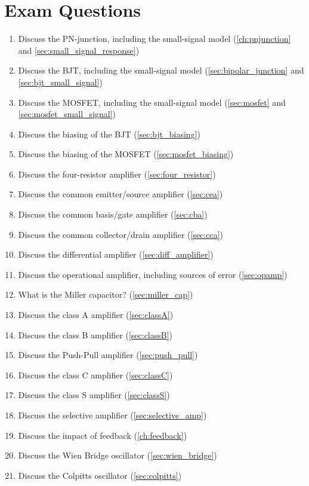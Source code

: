 \chapter{Exam Questions}
\label{app:exam_questions}
	\begin{enumerate}
	\item Discuss the PN-junction, including the small-signal model (\ref{ch:pnjunction} and \ref{sec:small_signal_response})
	\item Discuss the BJT, including the small-signal model (\ref{sec:bipolar_junction} and \ref{sec:bjt_small_signal})
	\item Discuss the MOSFET,  including the small-signal model (\ref{sec:mosfet} and \ref{sec:mosfet_small_signal})
	\item Discuss the biasing of the BJT (\ref{sec:bjt_biasing})
	\item Discuss the biasing of the MOSFET (\ref{sec:mosfet_biasing})
	\item Discuss the four-resistor amplifier (\ref{sec:four_resistor})
	\item Discuss the common emitter/source amplifier (\ref{sec:cea})
	\item Discuss the common basis/gate amplifier (\ref{sec:cba})
	\item Discuss the common collector/drain amplifier (\ref{sec:cca})
	\item Discuss the differential amplifier (\ref{sec:diff_amplifier})
	\item Discuss the operational amplifier, including sources of error (\ref{sec:opamp})
	\item What is the Miller capacitor? (\ref{sec:miller_cap})
	\item Discuss the class A amplifier (\ref{sec:classA})
	\item Discuss the class B amplifier (\ref{sec:classB})
	\item Discuss the Push-Pull amplifier (\ref{sec:push_pull})
	\item Discuss the class C amplifier (\ref{sec:classC})
	\item Discuss the class S amplifier (\ref{sec:classS})
	\item Discuss the selective amplifier (\ref{sec:selective_amp})
	\item Discuss the impact of feedback (\ref{ch:feedback})
	\item Discuss the Wien Bridge oscillator (\ref{sec:wien_bridge})
	\item Discuss the Colpitts oscillator (\ref{sec:colpitts})

\end{enumerate}
